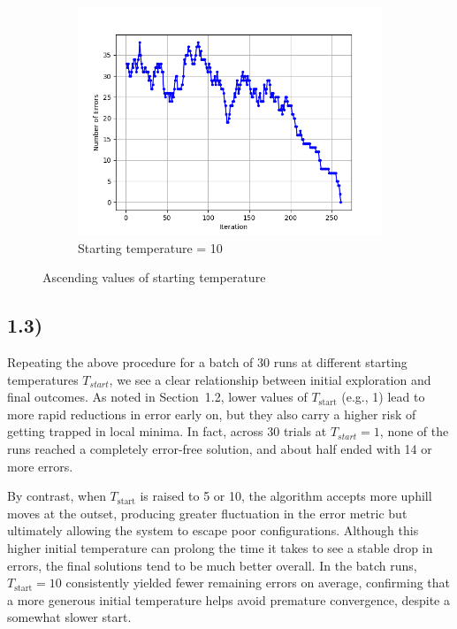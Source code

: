 \documentclass[11pt]{article}
\begin{document}
\begin{figure}[ht]
\vspace{1em}

\begin{subfigure}{0.48\textwidth}
\centering
\includegraphics[width=\textwidth]{images/Figure_5.png}
\caption{Starting temperature = 10}
\label{fig:startT_10}
\end{subfigure}
\caption{Ascending values of starting temperature}
\end{figure}

\newpage

\subsection*{1.3)}
Repeating the above procedure for a batch of 30 runs at different starting temperatures $T_{start}$,
we see a clear relationship between initial exploration and final outcomes. As noted in Section~1.2,
lower values of $T_{\text{start}}$ (e.g., 1) lead to more rapid reductions in error early on,
but they also carry a higher risk of getting trapped in local minima. In fact, across 30 trials at $T_{start} = 1$,
none of the runs reached a completely error-free solution, and about half ended with 14 or more errors.

By contrast, when $T_{\text{start}}$ is raised to 5 or 10,
the algorithm accepts more uphill moves at the outset, producing greater fluctuation in the error metric but ultimately allowing the system to escape poor configurations.
Although this higher initial temperature can prolong the time it takes to see a stable drop in errors, the final solutions tend to be much better overall.
In the batch runs, $T_{\text{start}} = 10$ consistently yielded fewer remaining errors on average,
confirming that a more generous initial temperature helps avoid premature convergence, despite a somewhat slower start.
\end{document}

